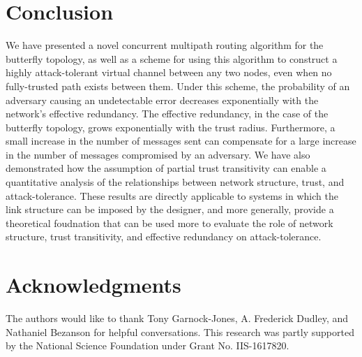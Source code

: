 \documentclass[twocolumn]{article}
\begin{document}
\section{Conclusion}
\label{sec-conclusion}

We have presented a novel concurrent multipath routing algorithm for the butterfly
topology,
as well as a scheme for using this algorithm to construct a highly attack-tolerant
virtual channel between any two nodes, even when no fully-trusted path exists
between them.
Under this scheme, the probability of an adversary causing an undetectable error
decreases exponentially with the network's effective redundancy.
The effective redundancy, in the case of the butterfly topology,
grows exponentially with the trust radius.
Furthermore, a small increase in the number of messages sent can compensate
for a large increase in the number of messages compromised by an adversary.
We have also demonstrated how the assumption of partial trust
transitivity can enable a quantitative analysis of the
relationships between network structure, trust, and attack-tolerance.
These results are directly applicable to systems in which the link
structure can be imposed by the designer,
and more generally, provide a theoretical foudnation that can be used more to evaluate
the role of network structure, trust transitivity, and effective redundancy
on attack-tolerance.

\section{Acknowledgments}
The authors would like to thank Tony Garnock-Jones, A. Frederick Dudley, and
Nathaniel Bezanson for helpful conversations.
This research was partly supported by the National Science Foundation under Grant No. IIS-1617820.


\end{document}
